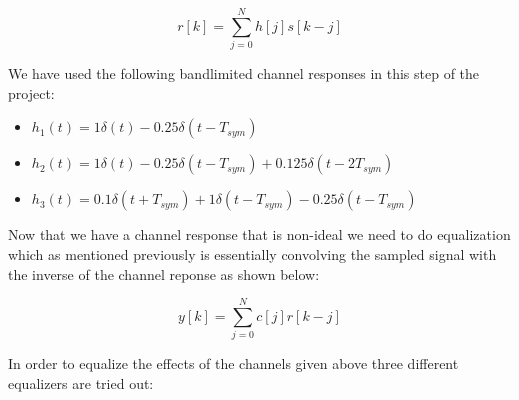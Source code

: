 \documentclass[]{article}
\begin{document}
\begin{equation}
\label{eq:channel}
r\left[k\right] = \sum_{j=0}^N h[j]s\left[k-j\right]
\end{equation}


We have used the following bandlimited channel responses in this step of the project:

\begin{itemize}
\item $h_1(t) = 1\delta(t) - 0.25\delta(t - T_{sym})  $
\item $h_2(t) = 1\delta(t) - 0.25\delta(t - T_{sym})   + 0.125\delta(t - 2T_{sym}) $
\item $h_3(t) = 0.1\delta(t + T_{sym}) +1\delta(t - T_{sym}) - 0.25\delta(t - T_{sym})   $
\end{itemize} 

Now that we have a channel response that is non-ideal we need to do equalization which as mentioned previously is essentially convolving the sampled signal with the inverse of the channel reponse as shown below: 

\begin{equation}
\label{eq:channel}
y\left[k\right] = \sum_{j=0}^N c[j]r\left[k-j\right]
\end{equation}






In order to equalize the effects of the channels given above three different equalizers are tried out: 
\end{document}
